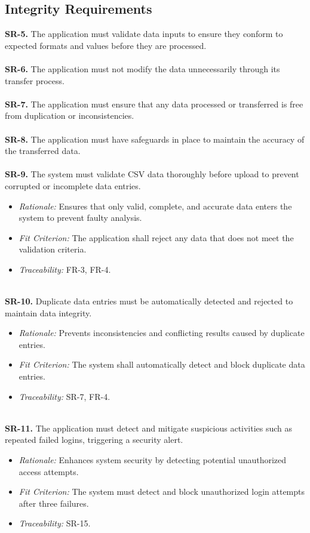 \documentclass{article}
\begin{document}
\subsection{Integrity Requirements}
\textbf{SR-5.} The application must validate data inputs to ensure they conform
  to expected formats and values before they are processed. \ \\
\ \\
\textbf{SR-6.} The application must not modify the data unnecessarily through
  its transfer process. \ \\
\ \\
\textbf{SR-7.} The application must ensure that any data processed or
  transferred is free from duplication or inconsistencies. \ \\
\ \\
\textbf{SR-8.} The application must have safeguards in place to maintain the
  accuracy of the transferred data. \ \\
  \ \\
\textbf{SR-9.} The system must validate CSV data thoroughly before upload to
prevent corrupted or incomplete data entries.
  \begin{itemize}
    \item \textit{Rationale:} Ensures that only valid, complete, and accurate
    data enters the system to prevent faulty analysis.
    \item \textit{Fit Criterion:} The application shall reject any data that
    does not meet the validation criteria.
    \item \textit{Traceability:} FR-3, FR-4.
  \end{itemize}
\ \\
\textbf{SR-10.} Duplicate data entries must be automatically detected and
rejected to maintain data integrity.
  \begin{itemize}
    \item \textit{Rationale:} Prevents inconsistencies and conflicting results
    caused by duplicate entries.
    \item \textit{Fit Criterion:} The system shall automatically detect and
    block duplicate data entries.
    \item \textit{Traceability:} SR-7, FR-4.
  \end{itemize}
\ \\
\textbf{SR-11.} The application must detect and mitigate suspicious activities
such as repeated failed logins, triggering a security alert.
  \begin{itemize}
    \item \textit{Rationale:} Enhances system security by detecting potential
    unauthorized access attempts.
    \item \textit{Fit Criterion:} The system must detect and block unauthorized
    login attempts after three failures.
    \item \textit{Traceability:} SR-15.
  \end{itemize}
\end{document}
